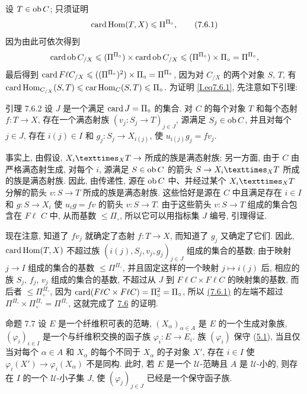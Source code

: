 设 $T\in \operatorname{ob} C$; 只须证明
\begin{equation*}
\operatorname{card}\operatorname{Hom}(T,X)\leqslant
  \Pi^{\Pi_\circ}{},\tag{7.6.1}
\end{equation*}\label{I.eq7.6.1}
因为由此可依次得到
$$
\operatorname{card}\operatorname{ob} C_{/X}\leqslant(\Pi^{\Pi_\circ})\times\operatorname{card} \operatorname{ob} C_{/X}\leqslant
(\Pi^{\Pi_\circ})\times \Pi_\circ=\Pi^{\Pi_\circ}{},
$$
最后得到 $\operatorname{card} F\ell C_{/X}\leqslant ((\Pi^{\Pi_\circ})^2)\times
\Pi_\circ=\Pi^{\Pi_\circ}$,
因为对 $C_{/X}$ 的两个对象 $S$, $T$, 有
$\operatorname{card} \operatorname{Hom}_{C_{/X}}(S,T)\leqslant
\operatorname{car}\operatorname{Hom}_C(S,T)\leqslant\Pi_\circ$.
为证明 \ref{I.eq7.6.1}, 先注意如下引理:

\begin{enonce*}{引理 7.6.2}
设 $J$ 是一个满足 $\operatorname{card} J=\Pi_\circ$ 的集合.
对 $C$ 的每个对象 $T$ 和每个态射 $f:T\rightarrow X$,
存在一个满态射族 $(v_j:S_j\rightarrow T)_{j\in J}$,
源满足 $S_j\in\operatorname{ob} C$,
并且对每个 $j\in J$, 存在 $i(j)\in I$ 和
$g_j:S_j\rightarrow X_{i(j)}$, 使 $u_{i(j)}g_j=fv_j$.
\end{enonce*}

事实上, 由假设, $\fprod{X_i}{T}{X}\rightarrow$ 所成的族是满态射族;
另一方面, 由于 $C$ 由严格满态射生成, 对每个 $i$,
源满足 $S\in \operatorname{ob} C$ 的箭头 $S\rightarrow \fprod{X_i}{T}{X}$
所成的族是满态射族.
因此, 由传递性, 源在 $\operatorname{ob} C$ 中、并经过某个 $\fprod{X_i}{T}{X}$
分解的箭头 $v:S\rightarrow T$ 所成的族是满态射族.
这些恰好是源在 $C$ 中且满足存在 $i\in I$ 和 $g:S\rightarrow X_i$
使 $u_ig=fv$ 的箭头 $v:S\rightarrow T$.
由于\pageoriginale 这些箭头 $v:S\rightarrow T$ 组成的集合包含在 $F\ell$ $C$ 中,
从而基数 $\leq \Pi_\circ$, 所以它可以用指标集 $J$ 编号, 引理得证.

现在注意, 知道了 $fv_j$ 就确定了态射 $f:T\rightarrow X$,
而知道了 $g_j$ 又确定了它们.
因此, $\operatorname{card}\operatorname{Hom}(T,X)$ 不超过族 $(i(j),S_j,v_j,g_j)_{j\in J}$
组成的集合的基数;
由于映射 $j\rightarrow I$ 组成的集合的基数 $\leq \Pi^{\Pi_\circ}$,
并且固定这样的一个映射 $j\mapsto i(j)$ 后,
相应的族 $S_j$, $f_j$, $v_j$ 组成的集合的基数,
不超过从 $J$ 到 $F\ell  C\times F\ell  C$ 的映射集的基数,
而后者 $\leq \Pi^{\Pi_\circ}_\circ$,
因为 $\operatorname{card}(F\ell C\times F\ell C)=\Pi_\circ^2=\Pi_\circ$,
所以 \hyperref[I.eq7.6.1]{(7.6.1)} 的左端不超过
$\Pi^{\Pi_\circ}\times \Pi_\circ^{\Pi_\circ}=\Pi^{\Pi_\circ}$,
这就完成了 \hyperref[I.prop7.6]{7.6} 的证明.

\begin{enonce*}{命题 7.7}
设 $E$ 是一个纤维积可表的范畴,
$(X_\alpha)_{\alpha\in A}$ 是 $E$ 的一个生成对象族,
$(\varphi_i)_{i\in I}$ 是一个与纤维积交换的函子族
$\varphi_i:E\rightarrow E_i$.
族 $(\varphi_i)$ 保守 (\hyperref[I.prop5.1]{5.1}),
当且仅当对每个 $\alpha \in A$ 和 $X_\alpha$ 的每个不同于 $X_\alpha$ 的子对象 $X'$,
存在 $i\in I$ 使 $\varphi_i(X')\rightarrow \varphi_i(X_\alpha)$ 不是同构.
此时, 若 $E$ 是一个 $𝒰$-范畴且 $A$ 是 $𝒰$-小的,
则存在 $I$ 的一个 $𝒰$-小子集 $J$,
使 $(\varphi_j)_{j\in J}$ 已经是一个保守函子族.
\end{enonce*}

